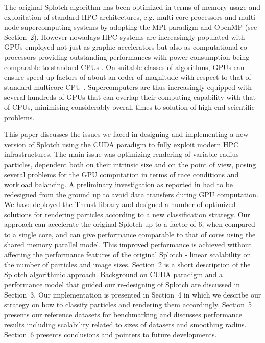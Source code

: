 \documentclass[1p]{elsarticle}
\begin{document}

The original Splotch algorithm has been optimized in terms of memory usage and exploitation of standard HPC architectures, e.g. multi-core processors and multi-node supercomputing systems by adopting the MPI paradigm \cite{jin:high-performance} and OpenMP (see Section~2). However nowadays HPC systems are increasingly populated with GPUs employed not just as graphic accelerators but also as computational co-processors providing outstanding performances with power consumption being comparable to standard CPUs \cite{}. On suitable classes of algorithms, GPUs can ensure speed-up factors of about an order of magnitude with respect to that of standard multicore CPU \cite{}. Supercomputers are thus increasingly equipped with several hundreds of GPUs that can overlap their computing capability with that of CPUs, minimising considerably overall times-to-solution of high-end scientific problems.

This paper discusses the issues we faced in designing and implementing a new version of Splotch using the CUDA paradigm to fully exploit modern HPC infrastructures. The main issue was optimizing rendering of variable radius particles, dependent both on their intrinsic size and on the point of view, posing several problems for the GPU computation in terms of race conditions and workload balancing. A preliminary investigation as reported in \cite{jin:high-performance} had to be redesigned from the ground up to avoid data transfers during GPU computation. We have deployed the Thrust library \cite{thrusturl} and designed a number of optimized solutions for rendering particles according to a new classification strategy. Our approach can accelerate the original Splotch up to a factor of 6, when compared to a single core, and 
can give performance comparable to that of cores using the shared memory parallel model. 
This improved performance is achieved without affecting the performance features of the original Splotch - linear scalability on the number of particles and image sizes. Section~2 is a short description of the Splotch algorithmic approach. Background on CUDA paradigm and a performance model that guided our re-designing of Splotch are discussed in Section~3. Our implementation is presented in Section~4 in which we describe our strategy on how to classify particles and rendering them accordingly. Section~5 presents our reference datasets for benchmarking and discusses performance results including scalability related to sizes of datasets and smoothing radius. Section~6 presents conclusions and pointers to future developments.
\end{document}
